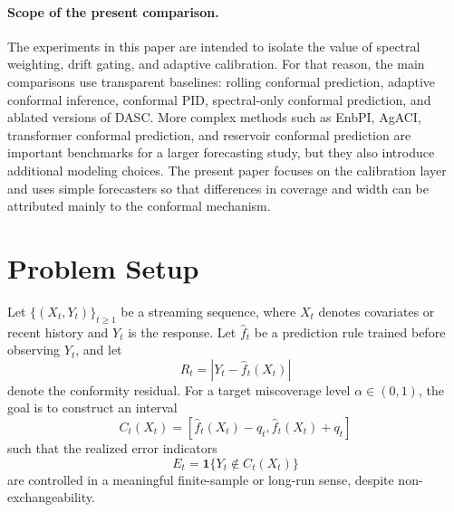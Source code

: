 \documentclass[11pt]{article}
\begin{document}
\paragraph{Scope of the present comparison.}
The experiments in this paper are intended to isolate the value of spectral weighting, drift gating, and adaptive calibration. For that reason, the main comparisons use transparent baselines: rolling conformal prediction, adaptive conformal inference, conformal PID, spectral-only conformal prediction, and ablated versions of DASC. More complex methods such as EnbPI, AgACI, transformer conformal prediction, and reservoir conformal prediction are important benchmarks for a larger forecasting study, but they also introduce additional modeling choices. The present paper focuses on the calibration layer and uses simple forecasters so that differences in coverage and width can be attributed mainly to the conformal mechanism.

\section{Problem Setup}

Let $\{(X_t,Y_t)\}_{t\geq 1}$ be a streaming sequence, where $X_t$ denotes covariates or recent history and $Y_t$ is the response. Let $\widehat f_t$ be a prediction rule trained before observing $Y_t$, and let
\[
    R_t = |Y_t-\widehat f_t(X_t)|
\]
denote the conformity residual. For a target miscoverage level $\alpha\in(0,1)$, the goal is to construct an interval
\[
    C_t(X_t) = [\widehat f_t(X_t)-q_t,\widehat f_t(X_t)+q_t]
\]
such that the realized error indicators
\[
    E_t = \mathbf{1}\{Y_t\notin C_t(X_t)\}
\]
are controlled in a meaningful finite-sample or long-run sense, despite non-exchangeability.
\end{document}
